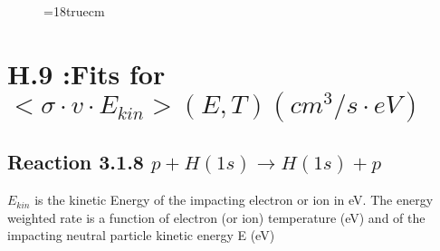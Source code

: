 \begin{figure} \label{2.18Bl}
\epsfxsize=18truecm
\end{figure}
\newpage



\section{H.9 :Fits for $<\sigma \cdot v \cdot E_{kin}> (E,T)  (cm^3/s
\cdot eV)$}

\subsection{
Reaction 3.1.8   $p + H(1s)  \rightarrow  H(1s) + p $
}
$E_{kin}$ is the kinetic Energy of the impacting electron or ion in eV.
The energy weighted rate is a function of electron (or ion) temperature
(eV)  and of the impacting neutral particle kinetic energy E (eV)

